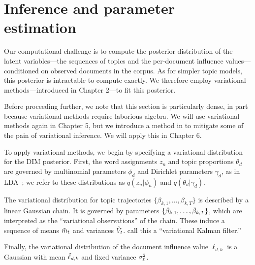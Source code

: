 \section{Inference and parameter estimation}
\label{section:inference}

Our computational challenge is to compute the posterior distribution
of the latent variables---the sequences of topics and the per-document
influence values---conditioned on observed documents in the corpus.
As for simpler topic models, this posterior is intractable to compute
exactly. We therefore employ variational methods---introduced in
Chapter 2---to fit this posterior.

Before proceeding further, we note that this section is particularly
dense, in part because variational methods require laborious algebra.
We will use variational methods again in Chapter 5, but we introduce a
method in  to
mitigate some of the pain of variational inference.  We will apply this
in Chapter 6.

To apply variational methods, we begin by specifying a variational
distribution for the DIM posterior.  First, the word assignments $z_n$
and topic proportions $\theta_d$ are governed by multinomial
parameters $\phi_d$ and Dirichlet parameters $\gamma_d$, as in
LDA~\citep{blei:2003}; we refer to these distributions as $q(z_n |
\phi_n)$ and $q(\theta_d | \gamma_d)$.

The variational distribution for topic trajectories
$\{\beta_{k,1}, \ldots, \beta_{k,T} \}$ is described by a linear
Gaussian chain.  It is governed by parameters $\{ \tilde{\beta}_{k,1}, \ldots,
\tilde{\beta}_{k,T} \}$, which are interpreted as the ``variational
observations'' of the chain.  These induce a sequence of means $\tilde{m}_t$
and variances $\tilde{V}_t$. \cite{blei:2006} call this a ``variational
Kalman filter.''

Finally, the variational distribution of the document influence value
$\ell_{d,k}$ is a Gaussian with mean $\tilde{\ell}_{d,k}$ and fixed variance
$\sigma^2_{\ell}$.



